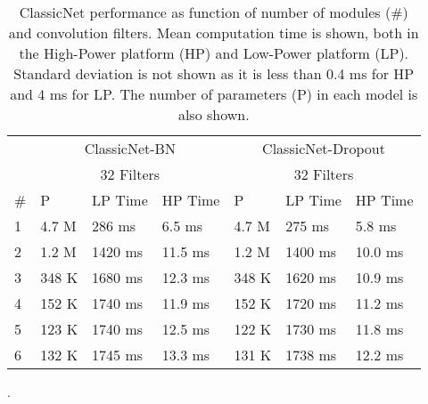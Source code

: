 \begin{table}[t]
	\centering
	\begin{tabular}{lllllll}
		\hline
		& \multicolumn{3}{c}{ClassicNet-BN} & \multicolumn{3}{c}{ClassicNet-Dropout}\\
		& \multicolumn{3}{c}{32 Filters} & \multicolumn{3}{c}{32 Filters}\\
		\#   	& P & LP Time & HP Time & P & LP Time & HP Time\\
		\hline 
		1 		& 4.7 M  & 286 ms  & 6.5 ms  & 4.7 M  & 275 ms  &  5.8 ms\\ 
		2  		& 1.2 M  & 1420 ms & 11.5 ms & 1.2 M  & 1400 ms & 10.0 ms\\ 
		3 		& 348 K  & 1680 ms & 12.3 ms & 348 K  & 1620 ms & 10.9 ms\\
		4 		& 152 K	 & 1740 ms & 11.9 ms & 152 K  & 1720 ms & 11.2 ms\\
		5 		& 123 K  & 1740 ms & 12.5 ms & 122 K  & 1730 ms & 11.8 ms\\
		6		& 132 K	 & 1745 ms & 13.3 ms & 131 K  & 1738 ms	& 12.2 ms\\
		\hline 
	\end{tabular}
	\vspace*{0.5cm}
	\caption[ClassicNet performance as function of number of modules and convolution filters]{ClassicNet performance as function of number of modules (\#) and convolution filters. Mean computation time is shown, both in the High-Power platform (HP) and Low-Power platform (LP). Standard deviation is not shown as it is less than 0.4 ms for HP and 4 ms for LP. The number of parameters (P) in each model is also shown.}
	\label{sic:classicNetPerformanceVsModules}. 
\end{table}


